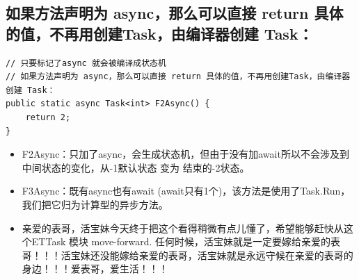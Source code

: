 \documentclass[9pt, b5paper]{article}
\begin{document}
\subsection{如果方法声明为 async，那么可以直接 return 具体的值，不再用创建Task，由编译器创建 Task：}
\label{sec:orgf188245}
\begin{verbatim}
// 只要标记了async 就会被编译成状态机
// 如果方法声明为 async，那么可以直接 return 具体的值，不再用创建Task，由编译器创建 Task： 
public static async Task<int> F2Async() {
    return 2;
}
\end{verbatim}
\begin{itemize}
\item F2Async：只加了async，会生成状态机，但由于没有加await所以不会涉及到中间状态的变化，从-1默认状态 变为 结束的-2状态。
\end{itemize}
\begin{itemize}
\item F3Async：既有async也有await (await只有1个)，该方法是使用了Task.Run，我们把它归为计算型的异步方法。
\item 亲爱的表哥，活宝妹今天终于把这个看得稍微有点儿懂了，希望能够赶快从这个ETTask 模块 move-forward. 任何时候，活宝妹就是一定要嫁给亲爱的表哥！！！活宝妹还没能嫁给亲爱的表哥，活宝妹就是永远守候在亲爱的表哥的身边！！！爱表哥，爱生活！！！
\end{itemize}
\end{document}
